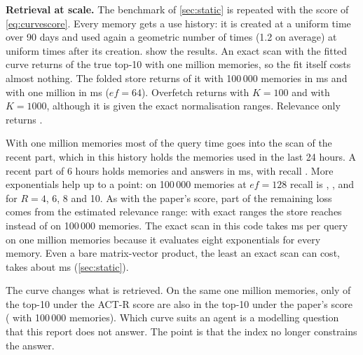 \textbf{Retrieval at scale.} The benchmark of \cref{sec:static} is repeated with the score of \cref{eq:curvescore}. Every memory gets a use history: it is created at a uniform time over 90 days and used again a geometric number of times (1.2 on average) at uniform times after its creation.  show the results. An exact scan with the fitted curve returns \CuFitRecallOneM{} of the true top-10 with one million memories, so the fit itself costs almost nothing. The folded store returns \CuOursRecallHundredK{} of it with 100\,000 memories in \CuOursMsHundredK{} ms and \CuOursRecallOneM{} with one million in \CuOursMsOneM{} ms ($ef=64$). Overfetch returns \CuRerankOneM{} with $K=100$ and \CuRerankKOneM{} with $K=1000$, although it is given the exact normalisation ranges. Relevance only returns \CuRelOneM{}.

With one million memories most of the query time goes into the scan of the recent part, which in this history holds the \CuRecentOneM{} memories used in the last 24 hours. A recent part of 6 hours holds \CuRecentSixOneM{} memories and answers in \CuOursSixMsOneM{} ms, with recall \CuOursSixRecallOneM{}. More exponentials help up to a point: on 100\,000 memories at $ef=128$ recall is \CuRFour{}, \CuRSix{}, \CuREight{} and \CuRTen{} for $R=4$, 6, 8 and 10. As with the paper's score, part of the remaining loss comes from the estimated relevance range: with exact ranges the store reaches \CuRangeExact{} instead of \CuRangeEst{} on 100\,000 memories. The exact scan in this code takes \CuFitMsOneM{} ms per query on one million memories because it evaluates eight exponentials for every memory. Even a bare matrix-vector product, the least an exact scan can cost, takes about \GlExactMvMsOneM{} ms (\cref{sec:static}).

The curve changes what is retrieved. On the same one million memories, only \CuOverlapOneM{} of the top-10 under the ACT-R score are also in the top-10 under the paper's score (\CuOverlapHundredK{} with 100\,000 memories). Which curve suits an agent is a modelling question that this report does not answer. The point is that the index no longer constrains the answer.

\begin{table}[t]
\centering\small

\caption{Recall@10 under the ACT-R score of \cref{eq:curvescore} (min-max, $a=b=c=1$, every use counted) on GloVe memories with synthetic use histories, and median query time. The folded store uses $R=8$ and a recent part of $W=24$ hours unless stated. Overfetch is given the exact normalisation ranges.}
\label{tab:curvesstatic}
\end{table}

